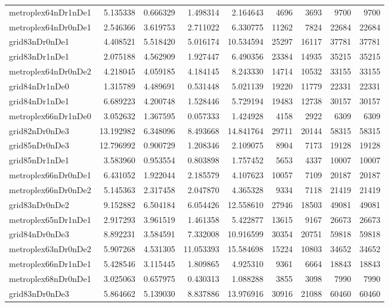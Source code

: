 \begin{longtable}{|l|r|r|r|r|r|r|r|r|}
metroplex64nDr1nDe1 & 5.135338 & 0.666329 & 1.498314 & 2.164643 & 4696 & 3693 & 9700 & 9700 \\
metroplex64nDr0nDe1 & 2.546366 & 3.619753 & 2.711022 & 6.330775 & 11262 & 7824 & 22684 & 22684 \\
grid83nDr0nDe1 & 4.408521 & 5.518420 & 5.016174 & 10.534594 & 25297 & 16117 & 37781 & 37781 \\
grid83nDr1nDe1 & 2.075188 & 4.562909 & 1.927447 & 6.490356 & 23384 & 14935 & 35215 & 35215 \\
metroplex64nDr0nDe2 & 4.218045 & 4.059185 & 4.184145 & 8.243330 & 14714 & 10532 & 33155 & 33155 \\
grid84nDr1nDe0 & 1.315789 & 4.489691 & 0.531448 & 5.021139 & 19220 & 11779 & 22331 & 22331 \\
grid84nDr1nDe1 & 6.689223 & 4.200748 & 1.528446 & 5.729194 & 19483 & 12738 & 30157 & 30157 \\
metroplex66nDr1nDe0 & 3.052632 & 1.367595 & 0.057333 & 1.424928 & 4158 & 2922 & 6309 & 6309 \\
grid82nDr0nDe3 & 13.192982 & 6.348096 & 8.493668 & 14.841764 & 29711 & 20144 & 58315 & 58315 \\
grid85nDr0nDe3 & 12.796992 & 0.900729 & 1.208346 & 2.109075 & 8904 & 7173 & 19128 & 19128 \\
grid85nDr1nDe1 & 3.583960 & 0.953554 & 0.803898 & 1.757452 & 5653 & 4337 & 10007 & 10007 \\
metroplex66nDr0nDe1 & 6.431052 & 1.922044 & 2.185579 & 4.107623 & 10057 & 7109 & 20187 & 20187 \\
metroplex66nDr0nDe2 & 5.145363 & 2.317458 & 2.047870 & 4.365328 & 9334 & 7118 & 21419 & 21419 \\
grid83nDr0nDe2 & 9.152882 & 6.504184 & 6.054426 & 12.558610 & 27946 & 18503 & 49081 & 49081 \\
metroplex65nDr1nDe1 & 2.917293 & 3.961519 & 1.461358 & 5.422877 & 13615 & 9167 & 26673 & 26673 \\
grid84nDr0nDe3 & 8.892231 & 3.584591 & 7.332008 & 10.916599 & 30354 & 20751 & 59818 & 59818 \\
metroplex63nDr0nDe2 & 5.907268 & 4.531305 & 11.053393 & 15.584698 & 15224 & 10803 & 34652 & 34652 \\
metroplex66nDr1nDe1 & 5.428546 & 3.115445 & 1.809865 & 4.925310 & 9361 & 6664 & 18843 & 18843 \\
metroplex68nDr0nDe1 & 3.025063 & 0.657975 & 0.430313 & 1.088288 & 3855 & 3098 & 7990 & 7990 \\
grid83nDr0nDe3 & 5.864662 & 5.139030 & 8.837886 & 13.976916 & 30916 & 21088 & 60460 & 60460 \\

\end{longtable}
